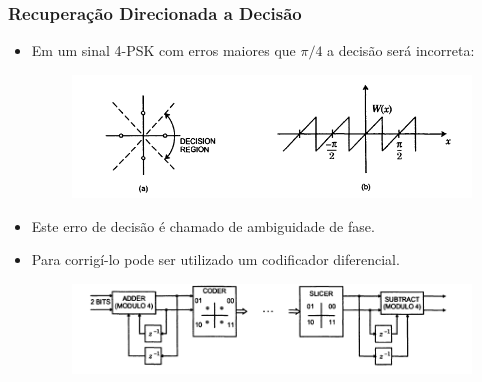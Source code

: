 \begin{frame}
	\frametitle{Recuperação Direcionada a Decisão}
	\begin{itemize}
		
		\item Em um sinal 4-PSK com erros maiores que $\pi/4$ a decisão será incorreta:
		
		\begin{figure}
			\includegraphics[width=0.8\columnwidth]{figs/4psk}
		\end{figure}
		
		\item Este erro de decisão é chamado de ambiguidade de fase.
		
		\item Para corrigí-lo pode ser utilizado um codificador diferencial.
		\begin{figure}
			\includegraphics[width=0.9\columnwidth]{figs/coddif}
		\end{figure}
		
	\end{itemize}
	
\end{frame}



